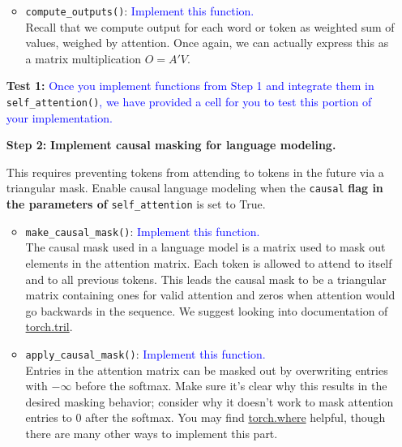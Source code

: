 \documentclass{article}
\begin{document}
\begin{enumerate}
\begin{itemize}
        \item \verb|compute_outputs()|: \textcolor{blue}{Implement this
        function.} \\
        Recall that we compute output for each word or token as weighted sum of
        values, weighed by attention. Once again, we can actually express this
        as a matrix multiplication $O = A' V$.
        
        \end{itemize}


        \item[\textbf{Test 1:}]
        \textcolor{blue}{Once you implement functions from Step 1 and integrate
        them in} \verb|self_attention()|\textcolor{blue}{, we have provided a
        cell for you to test this portion of your implementation.}

        \item[\textbf{Step 2:}]
        \textbf{Implement causal masking for language modeling.}
        
        This requires preventing tokens from attending to tokens in the future
        via a triangular mask. Enable causal language modeling when the
        \verb|causal|\textbf{ flag in the parameters of }\verb|self_attention|
        is set to True.
        
       \begin{itemize}
        \item \verb|make_causal_mask()|: \textcolor{blue}{Implement this
        function.} \\
        The causal mask used in a language model is a matrix used to mask out
        elements in the attention matrix. Each token is allowed to attend to
        itself and to all previous tokens. This leads the causal mask to be a
        triangular matrix containing ones for valid attention and zeros when
        attention would go backwards in the sequence. We suggest looking into
        documentation of
        \href{https://pytorch.org/docs/stable/generated/torch.tril}{torch.tril}.

        \item \verb|apply_causal_mask()|: \textcolor{blue}{Implement this
        function.} \\
        Entries in the attention matrix can be masked out by overwriting entries
        with $-\infty$ before the softmax. Make sure it's clear why this results
        in the desired masking behavior; consider why it doesn't work to mask
        attention entries to 0 after the softmax. You may find
        \href{https://pytorch.org/docs/stable/generated/torch.where}{torch.where}
        helpful, though there are many other ways to implement this part.
       \end{itemize}


\end{enumerate}
\end{document}
